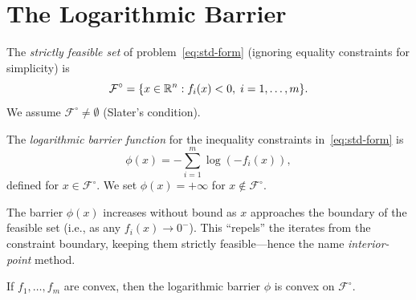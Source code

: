 \documentclass[11pt,a4paper]{article}
\begin{document}

\section{The Logarithmic Barrier}\label{sec:barrier}

\begin{definition}\label{def:strictly-feasible}
The \emph{strictly feasible set} of problem~\eqref{eq:std-form}
(ignoring equality constraints for simplicity) is
\begin{equation}\label{eq:strict-feas}
  \mathcal{F}^{\circ} = \{x \in \mathbb{R}^n : f_i(x) < 0,\;
  i = 1, \dots, m\}.
\end{equation}
We assume $\mathcal{F}^{\circ} \ne \emptyset$ (Slater's condition).
\end{definition}

\begin{definition}\label{def:barrier}
The \emph{logarithmic barrier function} for the inequality constraints
in~\eqref{eq:std-form} is
\begin{equation}\label{eq:barrier}
  \phi(x) = -\sum_{i=1}^m \log(-f_i(x)),
\end{equation}
defined for $x \in \mathcal{F}^{\circ}$. We set
$\phi(x) = +\infty$ for $x \notin \mathcal{F}^{\circ}$.
\end{definition}

\begin{remark}\label{rem:barrier-behavior}
The barrier $\phi(x)$ increases without bound as $x$ approaches
the boundary of the feasible set (i.e., as any $f_i(x) \to 0^-$).
This ``repels'' the iterates from the constraint boundary, keeping
them strictly feasible---hence the name \emph{interior-point} method.
\end{remark}

\begin{proposition}%
\label{prop:barrier-convex}
If $f_1, \dots, f_m$ are convex, then the logarithmic barrier $\phi$
is convex on $\mathcal{F}^{\circ}$.
\end{proposition}
\end{document}
